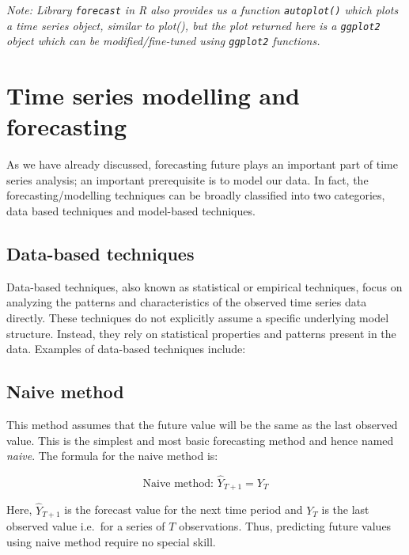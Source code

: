 \documentclass[
]{book}
\begin{document}
\emph{Note: Library \texttt{forecast} in R also provides us a function \texttt{autoplot()} which plots a time series object, similar to plot(), but the plot returned here is a \texttt{ggplot2} object which can be modified/fine-tuned using \texttt{ggplot2} functions.}

\hypertarget{time-series-modelling-and-forecasting}{%
\section{Time series modelling and forecasting}\label{time-series-modelling-and-forecasting}}

As we have already discussed, forecasting future plays an important part of time series analysis; an important prerequisite is to model our data. In fact, the forecasting/modelling techniques can be broadly classified into two categories, data based techniques and model-based techniques.

\hypertarget{data-based-techniques}{%
\subsection*{Data-based techniques}\label{data-based-techniques}}

Data-based techniques, also known as statistical or empirical techniques, focus on analyzing the patterns and characteristics of the observed time series data directly. These techniques do not explicitly assume a specific underlying model structure. Instead, they rely on statistical properties and patterns present in the data. Examples of data-based techniques include:

\hypertarget{naive-method}{%
\subsection{Naive method}\label{naive-method}}

This method assumes that the future value will be the same as the last observed value. This is the simplest and most basic forecasting method and hence named \emph{naive}. The formula for the naive method is:

\[
\text{Naive method: }\hat{Y}_{T+1} = Y_T
\]

Here, \(\hat{Y}_{T+1}\) is the forecast value for the next time period and \(Y_T\) is the last observed value i.e.~for a series of \(T\) observations. Thus, predicting future values using naive method require no special skill.
\end{document}
